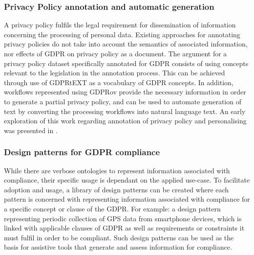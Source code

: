 \subsubsection*{Privacy Policy annotation and automatic generation}
A privacy policy fulfils the legal requirement for dissemination of information concerning the processing of personal data. Existing approaches for annotating privacy policies \cite{harkous_polisis_2018} do not take into account the semantics of associated information, nor effects of GDPR on privacy policy as a document. The argument for a privacy policy dataset specifically annotated for GDPR \cite{galle_case_2019} consists of using concepts relevant to the legislation in the annotation process. This can be achieved through use of GDPRtEXT as a vocabulary of GDPR concepts. In addition, workflows represented using GDPRov provide the necessary information in order to generate a partial privacy policy, and can be used to automate generation of text by converting the processing workflows into natural language text. An early exploration of this work regarding annotation of  privacy policy and personalising was presented in \cite{pandit_personalised_2018}.

\subsubsection*{Design patterns for GDPR compliance}
While there are verbose ontologies to represent information associated with compliance, their specific usage is dependant on the applied use-case. To facilitate adoption and usage, a library of design patterns can be created where each pattern is concerned with representing information associated with compliance for a specific concept or clause of the GDPR. For example: a design pattern representing periodic collection of GPS data from smartphone devices, which is linked with applicable clauses of GDPR as well as requirements or constraints it must fulfil in order to be compliant. Such design patterns can be used as the basis for assistive tools that generate and assess information for compliance.


